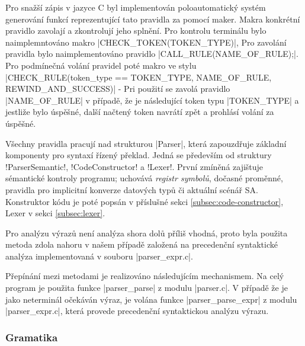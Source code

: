Pro snažší zápis v jazyce C byl implementován poloautomatický systém generování funkcí reprezentující tato pravidla za pomocí maker.
Makra konkrétní pravidlo zavolají a zkontrolují jeho splnění. Pro kontrolu terminálu bylo naimplemntováno makro
\ic|CHECK_TOKEN(TOKEN_TYPE)|,
Pro zavolání pravidla bylo naimplementováno pravidlo \ic|CALL_RULE(NAME_OF_RULE);|.
Pro podmínečná volání pravidel poté makro ve stylu
\ic|CHECK_RULE(token_type == TOKEN_TYPE, NAME_OF_RULE, REWIND_AND_SUCCESS)| - Pri použití se zavolá pravidlo
\ic|NAME_OF_RULE| v případě, že je následující token typu \ic|TOKEN_TYPE| a jestliže bylo úspěšné, další načtený
token navrátí zpět a prohlásí volání za úspěšné.

Všechny pravidla pracují nad strukturou \ic|Parser|, která zapouzdřuje základní komponenty pro syntaxí řízený překlad.
Jedná se především od struktury \ic!ParserSemantic!, \ic!CodeConstructor! a \ic!Lexer!. První zmíněná zajištuje sémantické
kontroly programu; uchovává \emph{registr symbolů}, dočasné proměnné, pravidla pro implicitní konverze datových typů či
aktuální scénář SA. Konstruktor kódu je poté popsán v příslušné sekci \ref{subsec:code-constructor}, Lexer v sekci
\ref{subsec:lexer}.

Pro analýzu výrazů není analýza shora dolů příliš vhodná, proto byla
použita metoda zdola nahoru v našem případě založená na precedenční
syntaktické analýza implementovaná v souboru \ic|parser_expr.c|.

Přepínání mezi metodami je realizováno následujícím mechanismem. Na celý program je použita funkce \ic|parser_parse|
z modulu \ic|parser.c|. V případě že je jako neterminál očekáván výraz, je volána funkce \ic|parser_parse_expr|
z modulu \ic|parser_expr.c|, která provede precedenční syntaktickou analýzu výrazu.

\subsubsection{Gramatika}

